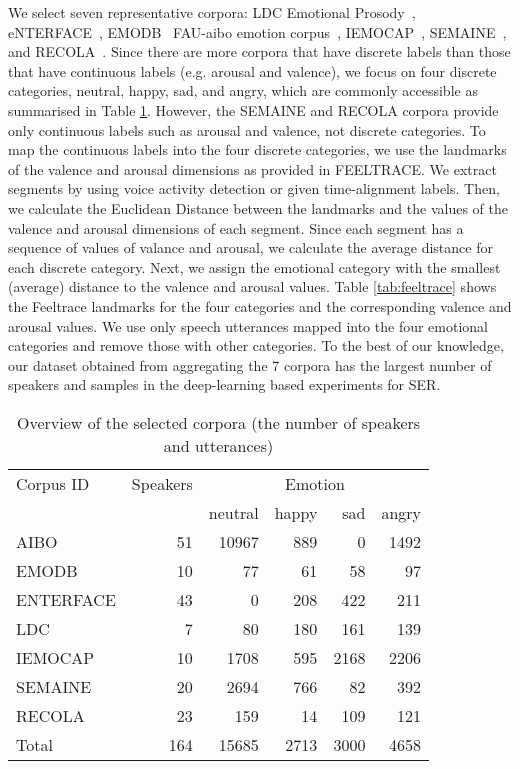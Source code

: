 \documentclass[conference, compsoc, twoside]{IEEEtran}
\begin{document}
We select seven representative corpora: LDC Emotional Prosody~\cite{liberman2002emotional}, eNTERFACE~\cite{martin2006enterface}, EMODB~\cite{burkhardt2005database} FAU-aibo emotion corpus~\cite{batliner2004you}, IEMOCAP~\cite{busso2008iemocap}, SEMAINE~\cite{mckeown2010semaine}, and RECOLA~\cite{ringeval2013introducing}. Since there are more corpora that have discrete labels than those that have continuous labels (e.g. arousal and valence), we focus on four discrete categories, neutral, happy, sad, and angry, which are commonly accessible as summarised in Table \ref{tab:corpora}. However, the SEMAINE and RECOLA corpora provide only continuous labels such as arousal and valence, not discrete categories. To map the continuous labels into the four discrete categories, we use the landmarks of the valence and arousal dimensions as provided in FEELTRACE\cite{cowie2000feeltrace}. We extract segments by using voice activity detection or given time-alignment labels. Then, we calculate the Euclidean Distance between the landmarks and the values of the valence and arousal dimensions of each segment. Since each segment has a sequence of values of valance and arousal, we calculate the average distance for each discrete category. Next, we assign the emotional category with the smallest (average) distance to the valence and arousal values. Table \ref{tab:feeltrace} shows the Feeltrace landmarks for the four categories and the corresponding valence and arousal values. We use only speech utterances mapped into the four emotional categories and remove those with other categories. To the best of our knowledge, our dataset obtained from aggregating the 7 corpora has the largest number of speakers and samples in the deep-learning based experiments for SER.

\begin{table}[!t]
\centering
\begin{tabular}{lrrrrr}

\hline
Corpus ID & Speakers  & \multicolumn{4}{c}{Emotion} \\ \cline{3-6} 
  & & neutral & happy & sad & angry \\
\hline
AIBO    & 51 & 10967  & 889 & 0 & 1492  \\
EMODB     & 10 & 77 & 61  & 58 & 97     \\
ENTERFACE   & 43 & 0  & 208 & 422 & 211     \\
LDC     &   7 & 80  & 180 & 161 & 139     \\
IEMOCAP   &   10  & 1708  & 595 & 2168 & 2206   \\
SEMAINE   & 20  & 2694  & 766 & 82 & 392  \\
RECOLA    & 23 & 159 & 14 &  109 & 121 \\
\hline
Total   & 164 & 15685 & 2713  & 3000  & 4658  \\
\hline
\end{tabular}
\vspace{0.15cm}
\caption{Overview of the selected corpora (the number of speakers and utterances)}\label{tab:corpora}
\end{table}
\end{document}
